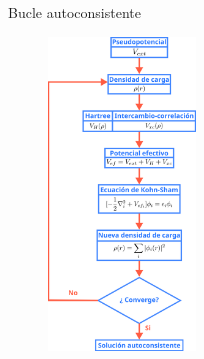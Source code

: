 \begin{frame}{Bucle autoconsistente}
     \begin{figure}[H]
        \centering
        \includegraphics[width=0.35\textwidth]{contenido/teoria/img_teoria/BucleAutoconsistente.png}
    \end{figure}
\end{frame}